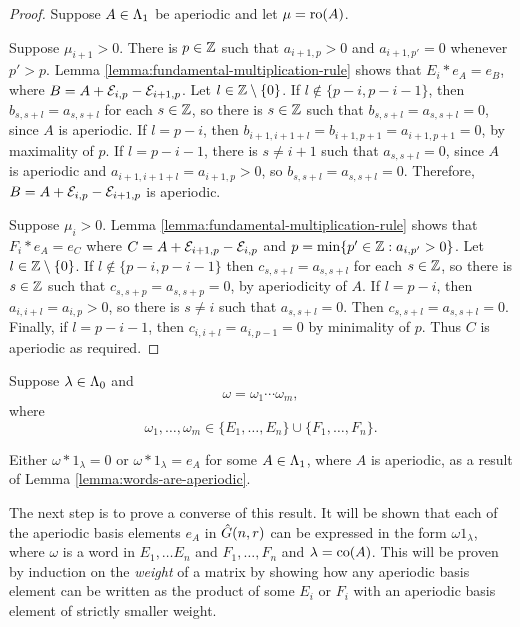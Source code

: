 \documentclass[a4paper, 11pt, twoside]{report}
\begin{document}
\begin{proof}
Suppose $A\in\Lambda_1{}$ be aperiodic and let $\mu=\operatorname{ro}(A)$.

Suppose $\mu_{i+1}>0$. There is $p\in\mathbb{Z}$ such that $a_{i+1,p}>0$ and $a_{i+1,p'}=0$ whenever $p'>p$. Lemma \ref{lemma:fundamental-multiplication-rule} shows that $E_i\ast e_A = e_B$, where $B=A+\mathcal{E}_{i,p}-\mathcal{E}_{i+1,p}$. Let $l\in\mathbb{Z}\setminus\{0\}$. If $l\notin\{p-i,p-i-1\}$, then $b_{s,s+l}=a_{s,s+l}$ for each $s\in\mathbb{Z}$, so there is $s\in\mathbb{Z}$ such that $b_{s,s+l}=a_{s,s+l}=0$, since $A$ is aperiodic. If $l=p-i$, then $b_{i+1,i+1+l} = b_{i+1,p+1}=a_{i+1,p+1}=0$, by maximality of $p$. If $l=p-i-1$, there is $s\neq i+1$ such that $a_{s,s+l}=0$, since $A$ is aperiodic and $a_{i+1,i+1+l}=a_{i+1,p}>0$, so $b_{s,s+l}=a_{s,s+l}=0$. Therefore, $B=A+\mathcal{E}_{i,p}-\mathcal{E}_{i+1,p}$ is aperiodic.

Suppose $\mu_i>0$. Lemma \ref{lemma:fundamental-multiplication-rule} shows that $F_i\ast e_A = e_C$ where $C=A+\mathcal{E}_{i+1,p}-\mathcal{E}_{i,p}$ and $p=\min\{p'\in\mathbb{Z}: a_{i,p'}>0\}$. Let $l\in\mathbb{Z}\setminus\{0\}$. If $l\notin\{p-i,p-i-1\}$ then $c_{s,s+l}=a_{s,s+l}$ for each $s\in\mathbb{Z}$, so there is $s\in\mathbb{Z}$ such that $c_{s,s+p}=a_{s,s+p}=0$, by aperiodicity of $A$. If $l=p-i$, then $a_{i,i+l}=a_{i,p}>0$, so there is $s\neq i$ such that $a_{s,s+l}=0$. Then $c_{s,s+l}=a_{s,s+l}=0$. Finally, if $l=p-i-1$, then $c_{i,i+l}=a_{i,p-1}=0$ by minimality of $p$. Thus $C$ is aperiodic as required.
\end{proof}

Suppose $\lambda\in\Lambda_0{}$ and
\begin{equation*}
\omega = \omega_1\cdots\omega_m,
\end{equation*}
where
\begin{equation*}
\omega_1,\ldots,\omega_m\in\{E_1,\ldots,E_n\}\cup\{F_1,\ldots,F_n\}.
\end{equation*}

Either $\omega\ast 1_\lambda=0$ or $\omega\ast 1_\lambda = e_A$ for some $A\in\Lambda_1{}$, where $A$ is aperiodic, as a result of Lemma \ref{lemma:words-are-aperiodic}.

The next step is to prove a converse of this result. It will be shown that each of the aperiodic basis elements $e_A$ in $\hat{G}(n,r)$ can be expressed in the form $\omega 1_\lambda$, where $\omega$ is a word in $E_1,\ldots E_n$ and $F_1,\ldots, F_n$ and $\lambda=\operatorname{co}(A)$. This will be proven by induction on the \emph{weight} of a matrix by showing how any aperiodic basis element can be written as the product of some $E_i$ or $F_i$ with an aperiodic basis element of strictly smaller weight.
\end{document}
